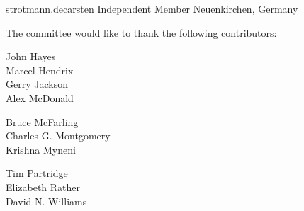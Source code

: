 	{strotmann.de}{carsten}
	{Independent Member}
	{Neuenkirchen, Germany}

The committee would like to thank the following contributors:

\begin{minipage}[t]{.3\linewidth}
John		Hayes \\
Marcel		Hendrix \\
Gerry		Jackson \\
Alex		McDonald \\
\end{minipage}
\hfill
\begin{minipage}[t]{.3\linewidth}
Bruce		McFarling \\
Charles G.	Montgomery \\
Krishna		Myneni \\
\end{minipage}
\hfill
\begin{minipage}[t]{.3\linewidth}
Tim		Partridge \\
Elizabeth	Rather \\
David N.	Williams \\
\end{minipage}